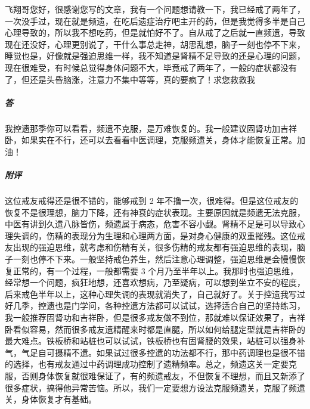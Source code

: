 \begin{case}
    飞翔哥您好，很感谢您写的文章，我有一个问题想请教一下，我已经戒了两年了，一次没手过，现在就是频遗，在吃后遗症治疗吧主开的药，但是我觉得多半是自己心理导致的，所以我不想吃药，但是就怕好不了。自从戒了之后就一直频遗，导致现在还没好，心理更别说了，干什么事总走神，胡思乱想，脑子一刻也停不下来，睡觉也是，好像就是强迫思维一样，我不知道是肾精不足导致的还是心理的问题，现在很难受，有时候总觉得身体问题不大，毕竟戒了两年了，一般的症状都没有了，但还是头昏脑涨，注意力不集中等等，真的要疯了！求您救救我
    \subparagraph{答} 我控遗那季你可以看看，频遗不克服，是万难恢复的。我一般建议固肾功加吉祥卧，如果实在不行，还可以去看看中医调理，克服频遗关，身体才能恢复正常。加油！
    \subparagraph{附评} 这位戒友戒得还是很不错的，能够戒到 2 年不撸一次，很难得。但是这位戒友的恢复不是很理想，脑力下降，还有神衰的症状表现。主要原因就是频遗无法克服，中医有讲到久遗八脉皆伤，频遗属于病态，危害不容小觑。肾精不足是可以导致心理失调的，伤精的表现分为生理和心理两方面，是对身心健康的双重摧残。这位戒友出现的强迫思维，就考虑和伤精有关，很多伤精的戒友都有强迫思维的表现，脑子一刻也停不下来。一般坚持戒色养生，然后注意心理调整，强迫思维是会慢慢恢复正常的，有一个过程，一般都需要 3 个月乃至半年以上。我那时也强迫思维，经常想一个问题，疯狂地想，还喜欢想病，乃至疑病，可以想到坐立不安的程度，后来戒色半年以上，这种心理失调的表现就消失了，自己就好了。关于控遗我写过好几季，控遗也是门学问，各种控遗方法都可以试试，选择适合自己的坚持练习，我一般推荐固肾功和吉祥卧，但是很多戒友做不到位，那就难以保证效果了，吉祥卧看似容易，然而很多戒友遗精醒来时都是直腿，所以如何给腿定型就是吉祥卧的最大难点。铁板桥和站桩也可以试试，铁板桥也有固肾腰的效果，站桩可以强身补气，气足自可摄精不遗。如果试过很多控遗的功法都不行，那中药调理也是很不错的选择，也有戒友通过中药调理成功控制了遗精频率。总之，频遗这关一定要克服，否则身体恢复就很难保证了，有的频遗戒友，不但恢复不理想，而且又新添了很多症状，搞得他异常苦恼。所以，我们一定要想方设法克服频遗关，克服了频遗关，身体恢复才有基础。
\end{case}

